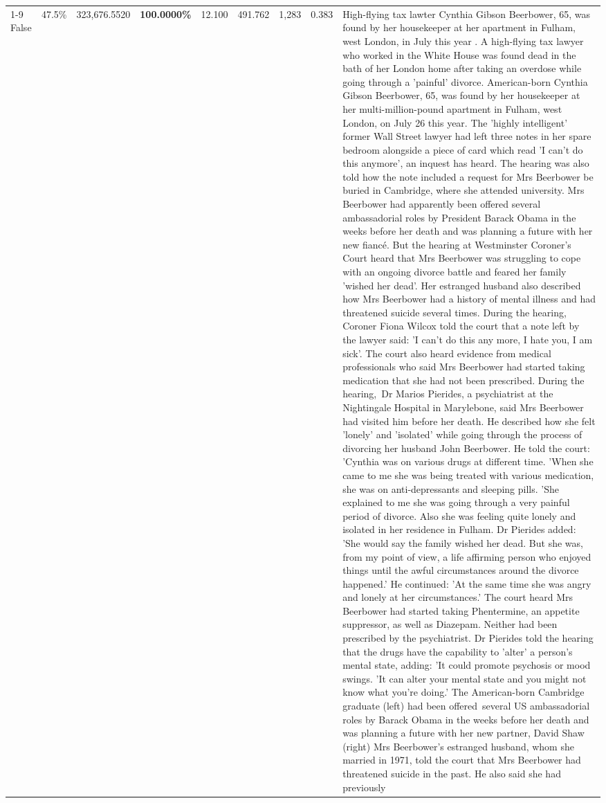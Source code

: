 \begin{table}[H]
\begin{tabular}{lllrlllll}
\cline{1-9}
False & 47.5\% & 323,676.5520 & \bfseries \color{red} 100.0000\% & 12.100 & 491.762 & 1,283 & 0.383 & High-flying tax lawter Cynthia Gibson Beerbower, 65, was found by her housekeeper at her apartment in Fulham, west London, in July this year . A high-flying tax lawyer who worked in the White House was found dead in the bath of her London home after taking an overdose while going through a 'painful' divorce. American-born Cynthia Gibson Beerbower, 65, was found by her housekeeper at her multi-million-pound apartment in Fulham, west London, on July 26 this year. The 'highly intelligent' former Wall Street lawyer had left three notes in her spare bedroom alongside a piece of card which read 'I can't do this anymore', an inquest has heard. The hearing was also told how the note included a request for Mrs Beerbower be buried in Cambridge, where she attended university. Mrs Beerbower had apparently been offered several ambassadorial roles by President Barack Obama in the weeks before her death and was planning a future with her new fiancé. But the hearing at Westminster Coroner's Court heard that Mrs Beerbower was struggling to cope with an ongoing divorce battle and feared her family 'wished her dead'. Her estranged husband also described how Mrs Beerbower had a history of mental illness and had threatened suicide several times. During the hearing, Coroner Fiona Wilcox told the court that a note left by the lawyer said: 'I can't do this any more, I hate you, I am sick'. The court also heard evidence from medical professionals who said Mrs Beerbower had started taking medication that she had not been prescribed. During the hearing, Dr Marios Pierides, a psychiatrist at the Nightingale Hospital in Marylebone, said Mrs Beerbower had visited him before her death. He described how she felt 'lonely' and 'isolated' while going through the process of divorcing her husband John Beerbower. He told the court: 'Cynthia was on various drugs at different time. 'When she came to me she was being treated with various medication, she was on anti-depressants and sleeping pills. 'She explained to me she was going through a very painful period of divorce. Also she was feeling quite lonely and isolated in her residence in Fulham. Dr Pierides added: 'She would say the family wished her dead. But she was, from my point of view, a life affirming person who enjoyed things until the awful circumstances around the divorce happened.' He continued: 'At the same time she was angry and lonely at her circumstances.' The court heard Mrs Beerbower had started taking Phentermine, an appetite suppressor, as well as Diazepam. Neither had been prescribed by the psychiatrist. Dr Pierides told the hearing that the drugs have the capability to 'alter' a person's mental state, adding: 'It could promote psychosis or mood swings. 'It can alter your mental state and you might not know what you're doing.' The American-born Cambridge graduate (left) had been offered several US ambassadorial roles by Barack Obama in the weeks before her death and was planning a future with her new partner, David Shaw (right) Mrs Beerbower's estranged husband, whom she married in 1971, told the court that Mrs Beerbower had threatened suicide in the past. He also said she had previously 
\end{tabular}
\end{table}
